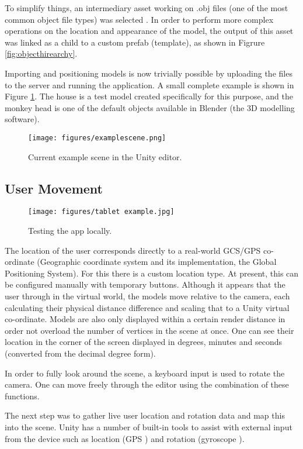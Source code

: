 \documentclass{article}
\begin{document}
To simplify things, an intermediary asset working on .obj files (one of the most common object file types) was selected \cite{objimporter}. In order to perform more complex operations on the location and appearance of the model, the output of this asset was linked as a child to a custom prefab (template), as shown in Figrure \ref{fig:objecthirearchy}. 

Importing and positioning models is now trivially possible by uploading the files to the server and running the application. A small complete example is shown in Figure \ref{fig:exscene}. The house is a test model created specifically for this purpose, and the monkey head is one of the default objects available in Blender (the 3D modelling software).

\begin{figure}[H]
    \centering
    \texttt{[image: figures/examplescene.png]}
    \caption{Current example scene in the Unity editor.}
    \label{fig:exscene}
\end{figure}

\subsection{User Movement}
\begin{wrapfigure}{r}{0.28\textwidth}
    \centering
    \texttt{[image: figures/tablet example.jpg]} 
    \caption{Testing the app locally.}
\end{wrapfigure}
The location of the user corresponds directly to a real-world GCS/GPS co-ordinate (Geographic coordinate system and its implementation, the Global Positioning System). For this there is a custom location type. At present, this can be configured manually with temporary buttons. Although it appears that the user through in the virtual world, the models move relative to the camera, each calculating their physical distance difference and scaling that to a Unity virtual co-ordinate. Models are also only displayed within a certain render distance in order not overload the number of vertices in the scene at once. One can see their location in the corner of the screen displayed in degrees, minutes and seconds (converted from the decimal degree form).

In order to fully look around the scene, a keyboard input is used to rotate the camera. One can move freely through the editor using the combination of these functions. 

The next step was to gather live user location and rotation data and map this into the scene. Unity has a number of built-in tools to assist with external input from the device such as location (GPS \cite{unitylocation}) and rotation (gyroscope \cite{unitygyro}).
\end{document}
